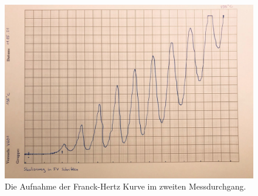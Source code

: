 \begin{figure}[H]
  \centering
  \includegraphics[scale=0.25]{content/kurve4.jpeg}
  \caption{Die Aufnahme der Franck-Hertz Kurve im zweiten Messdurchgang.}
  \label{fig:franckhertz2}
\end{figure}
